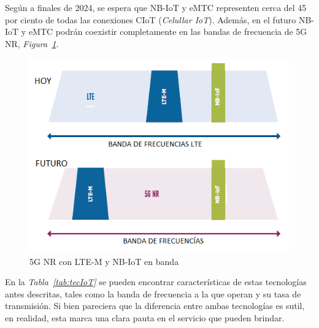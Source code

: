 Según \parencite{Ericsson2019} a finales de 2024, se espera que NB-IoT y eMTC representen cerca del 45 por ciento de todas las conexiones CIoT (\textit{Celullar IoT}). Además, en el futuro NB-IoT y eMTC podrán coexistir completamente en las bandas de frecuencia de 5G NR, \textit{Figura~\ref{fig:5gnr}}.\newline

\begin{figure}[th]
\centering
\includegraphics[scale=1]{Figures/5G NR con LTE-M y NB-IoT en banda}
\decoRule
\caption[5G NR con LTE-M y NB-IoT en banda]{5G NR con LTE-M y NB-IoT en banda}
\label{fig:5gnr}
\end{figure}

En la \textit{Tabla~\ref{tab:tecIoT}} se pueden encontrar características de estas tecnologías antes descritas, tales como la banda de frecuencia a la que operan y su tasa de transmisión. Si bien pareciera que la diferencia entre ambas tecnologías es sutil, en realidad, esta marca una clara pauta en el servicio que pueden brindar. \newline

